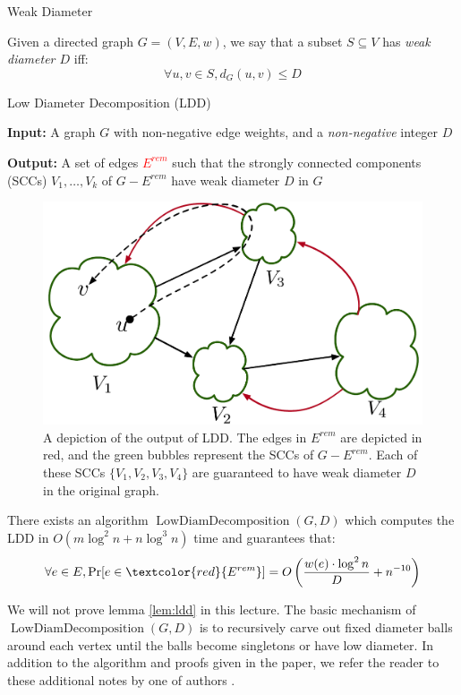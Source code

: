 \documentclass[11pt]{article}
\newcommand{\SCCDecomposition}{\operatorname{LowDiamDecomposition}}
\newcommand{\LowDiamDecomposition}{\SCCDecomposition}
\newcommand{\esep}{E^{rem}}
\newenvironment{tight_itemize}{
\begin{itemize}
 \setlength{\itemsep}{2pt}
 \setlength{\parskip}{1pt}
}{\end{itemize}}
\begin{document}
\begin{definition}{Weak Diameter}

    Given a directed graph $G = (V, E, w)$, we say that a subset $S \subseteq V$ has \emph{weak diameter $D$} iff:
    $$\forall u, v \in S, d_G(u,v) \leq D$$
\end{definition}

\begin{definition}{Low Diameter Decomposition (LDD)}
         \begin{tight_itemize}
             \item \textbf{Input:} A graph $G$ with non-negative edge weights, and a \emph{non-negative} integer $D$
             \item \textbf{Output:} A set of edges \textcolor{red}{$\esep$} such that the strongly connected components (SCCs) $V_1, \dots, V_k$ of $G - \esep$ have weak diameter $D$ in $G$
         \end{tight_itemize}
\end{definition}
\begin{figure}[ht]
    \centering
    \includegraphics[width=0.4\linewidth]{images/ldd.pdf}
    \caption{A depiction of the output of LDD. The edges in $\esep$ are depicted in red, and the green bubbles represent the SCCs of $G - \esep$. Each of these SCCs $\{V_1, V_2, V_3, V_4\}$ are guaranteed to have weak diameter $D$ in the original graph.}
    \label{fig:my_label}
\end{figure}

\begin{lemma} \label{lem:ldd}
    There exists an algorithm $\LowDiamDecomposition(G, D)$ which computes the LDD in  $O(m\log^2 n+n\log^3 n)$ time and guarantees that:
    $$\forall e \in E, \Pr[e \in \textcolor{red}{\esep}] = O\left(\frac{w(e) \cdot \log^2 n}{D} + n^{-10}\right)$$
\end{lemma}

 We will not prove lemma \ref{lem:ldd} in this lecture. The basic mechanism of $\LowDiamDecomposition(G, D)$ is to recursively carve out fixed diameter balls around each vertex until the balls become singletons or have low diameter. In addition to the algorithm and proofs given in the paper, we refer the reader to these additional notes by one of authors \cite{LDD}.
\end{document}
